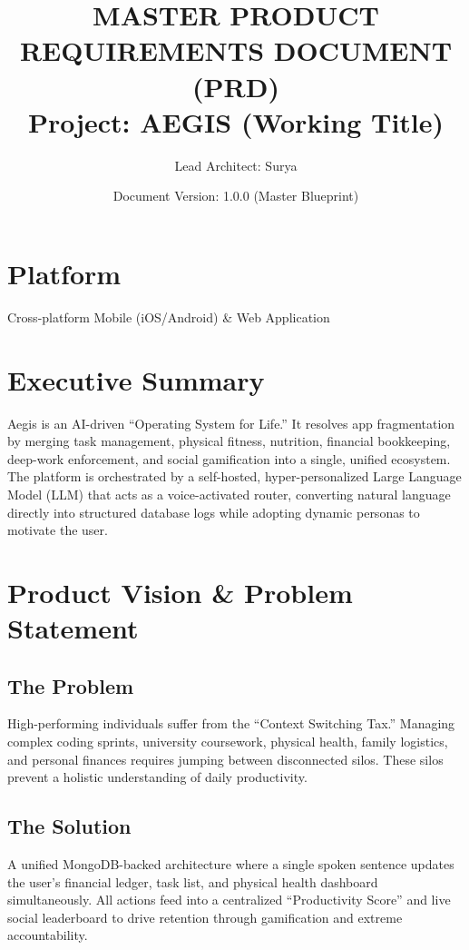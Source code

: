 \documentclass[11pt,oneside]{article}
\title{\textbf{\Large MASTER PRODUCT REQUIREMENTS DOCUMENT (PRD)}\\[0.3cm]{\normalsize Project: AEGIS (Working Title)}}
\author{Lead Architect: Surya}
\date{Document Version: 1.0.0 (Master Blueprint)}
\begin{document}
\maketitle

\section*{Platform}
Cross-platform Mobile (iOS/Android) \& Web Application

\tableofcontents
\newpage

\section{Executive Summary}

Aegis is an AI-driven ``Operating System for Life.'' It resolves app fragmentation by merging task management, physical fitness, nutrition, financial bookkeeping, deep-work enforcement, and social gamification into a single, unified ecosystem. The platform is orchestrated by a self-hosted, hyper-personalized Large Language Model (LLM) that acts as a voice-activated router, converting natural language directly into structured database logs while adopting dynamic personas to motivate the user.

\section{Product Vision \& Problem Statement}

\subsection*{The Problem}
High-performing individuals suffer from the ``Context Switching Tax.'' Managing complex coding sprints, university coursework, physical health, family logistics, and personal finances requires jumping between disconnected silos. These silos prevent a holistic understanding of daily productivity.

\subsection*{The Solution}
A unified MongoDB-backed architecture where a single spoken sentence updates the user's financial ledger, task list, and physical health dashboard simultaneously. All actions feed into a centralized ``Productivity Score'' and live social leaderboard to drive retention through gamification and extreme accountability.
\end{document}
